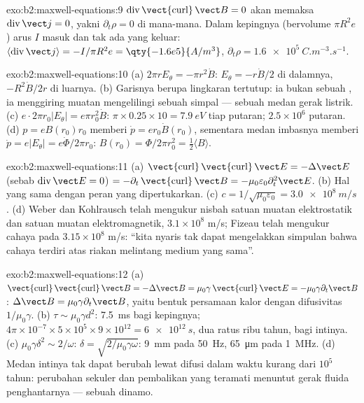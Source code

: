 \begin{solution}{exo:b2:maxwell-equations:9}
$\operatorname{div}\operatorname{\vect{curl}}\vect B = 0$ akan memaksa $\operatorname{div}\vect j =
0$, yakni $\partial_t\rho = 0$ di mana-mana. Dalam kepingnya (bervolume $\pi R^2e$)
arus $I$ masuk dan tak ada yang keluar: $\langle\operatorname{div}\vect j\rangle =
-I/\pi R^2e = \qty{-1.6e5}{A/m^3}$, $\partial_t\rho = \qty{+1.6e5}{C.m^{-3}.s^{-1}}$.
\end{solution}

\begin{solution}{exo:b2:maxwell-equations:10}
(a) $2\pi rE_\theta = -\pi r^2\dot B$: $E_\theta = -r\dot B/2$ di dalamnya, $-R^2\dot B/2r$
di luarnya. (b) Garisnya berupa lingkaran tertutup: ia bukan sebuah , ia
menggiring muatan mengelilingi sebuah simpal --- sebuah medan gerak listrik. (c) $e\cdot2\pi r_0
|E_\theta| = e\pi r_0^2\dot B$: $\pi \times 0.25 \times 10 = \qty{7.9}{eV}$ tiap putaran; $2.5 \times 10^6$
putaran. (d) $p = eB(r_0)r_0$ memberi $\dot p = er_0\dot B(r_0)$, sementara medan
imbasnya memberi $\dot p = e|E_\theta| = e\dot\Phi/2\pi r_0$: $B(r_0) = \Phi/2\pi r_0^2 =
\tfrac12\langle B\rangle$.
\end{solution}

\begin{solution}{exo:b2:maxwell-equations:11}
(a) $\operatorname{\vect{curl}}\operatorname{\vect{curl}}\vect E = -\Delta\vect E$ (sebab $\operatorname{div}
\vect E = 0$) $= -\partial_t\operatorname{\vect{curl}}\vect B = -\mu_0\varepsilon_0\partial_t^2\vect E$. (b)
Hal yang sama dengan peran yang dipertukarkan. (c) $c = 1/\sqrt{\mu_0\varepsilon_0} = \qty{3.0e8}{m/s}$.
(d) Weber dan Kohlrausch telah mengukur nisbah satuan muatan elektrostatik
dan satuan muatan elektromagnetik, $3.1 \times 10^8$ m/s; Fizeau telah
mengukur cahaya pada $3.15 \times 10^8$ m/s: ``kita nyaris tak dapat mengelakkan
simpulan bahwa cahaya terdiri atas riakan melintang medium
yang sama''.
\end{solution}

\begin{solution}{exo:b2:maxwell-equations:12}
(a) $\operatorname{\vect{curl}}\operatorname{\vect{curl}}\vect B = -\Delta\vect B = \mu_0\gamma\operatorname{\vect{curl}}
\vect E = -\mu_0\gamma\partial_t\vect B$: $\Delta\vect B = \mu_0\gamma\partial_t\vect B$, yaitu bentuk
persamaan kalor dengan difusivitas $1/\mu_0\gamma$. (b) $\tau \sim \mu_0\gamma d^2$: \qty{7.5}{ms}
bagi kepingnya; $4\pi \times 10^{-7} \times 5 \times 10^5 \times 9 \times 10^{12} = \qty{6e12}{s}$, dua ratus
ribu tahun, bagi intinya. (c) $\mu_0\gamma\delta^2 \sim 2/\omega$: $\delta = \sqrt{2/\mu_0
\gamma\omega}$: \qty{9}{mm} pada \qty{50}{Hz}, \qty{65}{\micro m} pada \qty{1}{MHz}. (d) Medan
intinya tak dapat berubah lewat difusi dalam waktu kurang dari $10^5$ tahun:
perubahan sekuler dan pembalikan yang teramati menuntut gerak
fluida penghantarnya --- sebuah dinamo.
\end{solution}

